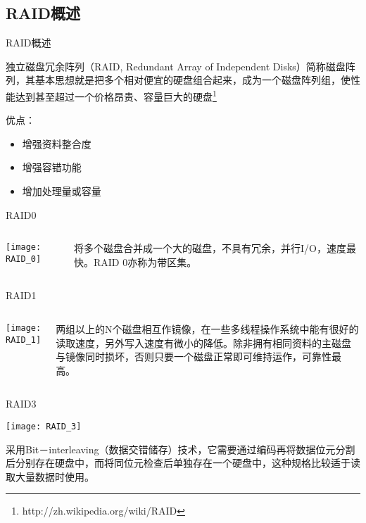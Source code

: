 \subsection{RAID概述}
\begin{frame}{RAID概述}

独立磁盘冗余阵列（RAID, Redundant Array of Independent Disks）简称磁盘阵列，其基本思想就是把多个相对便宜的硬盘组合起来，成为一个磁盘阵列组，使性能达到甚至超过一个价格昂贵、容量巨大的硬盘\footnote{http://zh.wikipedia.org/wiki/RAID}

优点：
\begin{itemize}
\item 增强资料整合度
\item 增强容错功能
\item 增加处理量或容量
\end{itemize}
\end{frame}

\begin{frame}{RAID0}
\begin{columns}
\column{2cm}

\texttt{[image: RAID\_0]}

\column{5cm}
将多个磁盘合并成一个大的磁盘，不具有冗余，并行I/O，速度最快。RAID 0亦称为带区集。

\end{columns}
\end{frame}

\begin{frame}{RAID1}
\begin{columns}
\column{2cm}
\texttt{[image: RAID\_1]}

\column{5cm}

两组以上的N个磁盘相互作镜像，在一些多线程操作系统中能有很好的读取速度，另外写入速度有微小的降低。除非拥有相同资料的主磁盘与镜像同时损坏，否则只要一个磁盘正常即可维持运作，可靠性最高。

\end{columns}
\end{frame}

%

\begin{frame}{RAID3}

\texttt{[image: RAID\_3]}

采用Bit－interleaving（数据交错储存）技术，它需要通过编码再将数据位元分割后分别存在硬盘中，而将同位元检查后单独存在一个硬盘中，这种规格比较适于读取大量数据时使用。

\end{frame}

